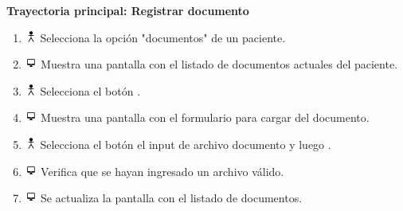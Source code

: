 \textbf{Trayectoria principal: Registrar documento}  
\begin{enumerate}
\item \includegraphics[height=1em]{pictures/actor.png} Selecciona la opción "documentos" de un paciente.
\item \includegraphics[height=1em]{pictures/sistema.png} Muestra una pantalla con el listado de documentos actuales del paciente.
\item \includegraphics[height=1em]{pictures/actor.png} Selecciona el botón .
\item \includegraphics[height=1em]{pictures/sistema.png} Muestra una pantalla con el formulario para cargar del documento.
\item \includegraphics[height=1em]{pictures/actor.png} Selecciona el botón el input de archivo documento y luego .
\item \includegraphics[height=1em]{pictures/sistema.png} Verifica que se hayan ingresado un archivo válido.
\item \includegraphics[height=1em]{pictures/sistema.png} Se actualiza la pantalla con el listado de documentos.
\end{enumerate} \bigskip

